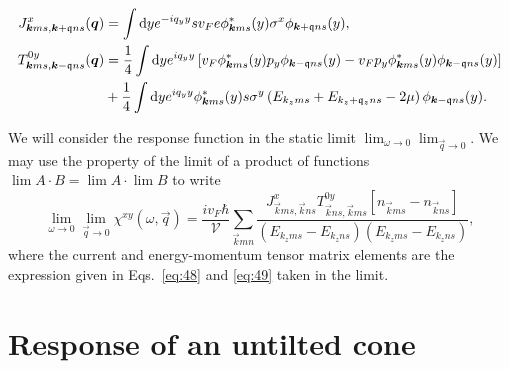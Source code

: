 \begin{align}\label{eq:48}
  J^x_{\bm{k}ms, \bm{k}+\mathfrak{q}ns}(\bm{q}) &= \int \mathrm{d}y
                                                e^{-i q_y y}
                                                s v_F e\phi ^{*}_{\bm{k}m s}(y) \sigma^x
                                                \phi _{\bm{k}+\mathfrak{q}n s}(y),\\
  T^{0y}_{\bm{k} m s, \bm{k}-\mathfrak{q} n s}(\bm{q}) &= \frac{1}{4} \label{eq:49}
                                                           \int \mathrm{d}y
                                                           e^{iq_y y}
                                                           \left[
                                                           v_F \phi ^{*}_{\bm{k}m s}(y) p_y
                                                           \phi _{\bm{k}-\mathfrak{q}n s}(y)
                                                           -
                                                           v_Fp_y \phi ^{*}_{\bm{k}m s}(y)
                                                           \phi _{\bm{k}-\mathfrak{q}n s}(y)
                                                           \right]\\
  \nonumber &+ \frac{1}{4} 
              \int \mathrm{d}y
              e^{iq_y y}
              \phi ^{*}_{\bm{k}m s}(y)
              s\sigma ^y
              \left(
              E_{k_zm s} + E_{k_z+\mathfrak{q}_z n s} - 2 \mu
              \right)
              \phi _{\bm{k}-\mathfrak{q} n s}(y).
\end{align}

We will consider the response function in the static limit \( \lim_{\omega \to 0} \lim_{\vec{q} \to 0} \).
We may use the property of the limit of a product of functions \( \lim A\cdot B = \lim A \cdot \lim B \) to write
\begin{equation}
  \lim_{\omega \to 0} \lim_{\vec{q} \to 0} \chi^{xy}(\omega, \vec{q}) = \frac{i v_F \hbar}{\mathcal{V}} \sum\limits_{\vec{k} m n}^{}
  \frac{
    J^x_{\vec{k} m s, \vec{k} n s} T^{0y}_{\vec{k} n s, \vec{k} m s} [n_{\vec{k} m s} - n_{\vec{k} n s}]
  }{
    (E_{k_z m s} - E_{k_z n s}) (E_{k_z m s}- E_{k_z n s})
  },
\end{equation}
where the current and energy-momentum tensor matrix elements are the expression given in Eqs.~\eqref{eq:48} and \eqref{eq:49} taken in the limit.


\section{Response of an untilted cone}
